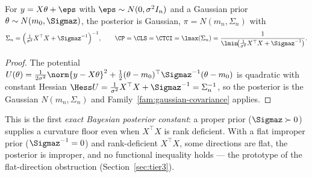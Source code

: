 \documentclass[../main.tex]{subfiles}
\begin{document}
\begin{family}
\label{fam:linear-regression}
For $y=X\theta+\eps$ with $\eps\sim N(0,\sigma^2 I_n)$ and a Gaussian prior
$\theta\sim N(m_0,\Sigmaz)$, the posterior is Gaussian, $\pi=N(m_n,\Sigma_n)$ with
\[
  \Sigma_n=\Big(\tfrac1{\sigma^2}X^\top X+\Sigmaz^{-1}\Big)^{-1},
  \qquad
  \CP=\CLS=\CTCI=\lmax(\Sigma_n)=\frac{1}{\lmin\!\big(\tfrac1{\sigma^2}X^\top X+\Sigmaz^{-1}\big)} .
\]
\end{family}

\begin{proof}
The potential $U(\theta)=\tfrac1{2\sigma^2}\norm{y-X\theta}^2+\tfrac12(\theta-m_0)^\top\Sigmaz^{-1}(\theta-m_0)$
is quadratic with constant Hessian $\Hess U=\tfrac1{\sigma^2}X^\top X+\Sigmaz^{-1}=\Sigma_n^{-1}$,
so the posterior is the Gaussian $N(m_n,\Sigma_n)$ and Family~\ref{fam:gaussian-covariance}
applies.
\end{proof}

\noindent This is the first \emph{exact Bayesian posterior constant}: a proper prior
($\Sigmaz\succ0$) supplies a curvature floor even when $X^\top X$ is rank deficient. With a
flat improper prior ($\Sigmaz^{-1}=0$) and rank-deficient $X^\top X$, some directions are
flat, the posterior is improper, and no functional inequality holds --- the prototype of the
flat-direction obstruction (Section~\ref{sec:tier3}).
\end{document}

